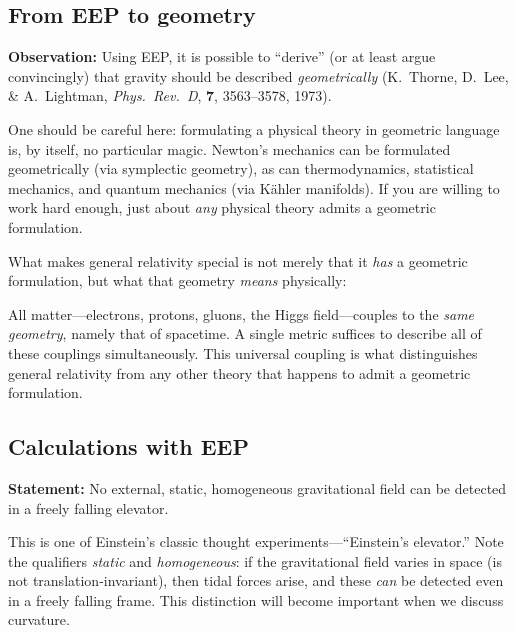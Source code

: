 \subsection{From EEP to geometry}

\textbf{Observation:} Using EEP, it is possible to ``derive'' (or at
least argue convincingly) that gravity should be described
\emph{geometrically}
(K.~Thorne, D.~Lee, \& A.~Lightman,
\emph{Phys.\ Rev.\ D}, \textbf{7}, 3563--3578, 1973).

One should be careful here: formulating a physical theory in
geometric language is, by itself, no particular magic.  Newton's
mechanics can be formulated geometrically (via symplectic geometry),
as can thermodynamics, statistical mechanics, and quantum mechanics
(via K\"ahler manifolds).  If you are willing to work hard enough,
just about \emph{any} physical theory admits a geometric formulation.

What makes general relativity special is not merely that it
\emph{has} a geometric formulation, but what that geometry
\emph{means} physically:

\begin{keyresult}
  All matter---electrons, protons, gluons, the Higgs field---couples
  to the \emph{same geometry}, namely that of spacetime.  A single
  metric suffices to describe all of these couplings simultaneously.
  This universal coupling is what distinguishes general relativity
  from any other theory that happens to admit a geometric formulation.
\end{keyresult}

\subsection{Calculations with EEP}

\textbf{Statement:} No external, static, homogeneous gravitational
field can be detected in a freely falling elevator.

\smallskip
This is one of Einstein's classic thought experiments---``Einstein's
elevator.''  Note the qualifiers \emph{static} and
\emph{homogeneous}: if the gravitational field varies in space (is
not translation-invariant), then tidal forces arise, and these
\emph{can} be detected even in a freely falling frame.  This
distinction will become important when we discuss curvature.

